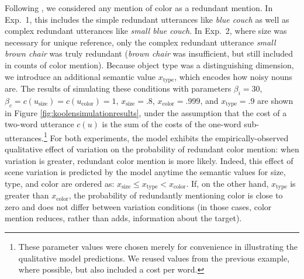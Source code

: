 \documentclass[11pt]{article}
\newcommand{\figref}[1]{Figure \ref{#1}}
\begin{document}
Following , we considered any mention of color as a redundant mention. In Exp.~1, this includes the simple redundant utterances like \emph{blue couch} as well as complex redundant utterances like \emph{small blue couch}. In Exp.~2, where size was necessary for unique reference, only the complex redundant utterance \emph{small brown chair} was truly redundant (\emph{brown chair} was insufficient, but still included in counts of color mention). 
Because object type was a distinguishing dimension, we introduce an additional semantic value $x_{\text{type}}$, which encodes how noisy nouns are.
The results of simulating these conditions with parameters $\beta_i = 30$, $ \beta_c = c(u_{\textrm{size}}) = c(u_{\textrm{color}}) = 1$, $x_{\text{size}} = .8$, $x_{\text{color}} = .999$, and $x_{\text{type}} = .9$ are shown in \figref{fig:koolensimulationresults}, under the assumption that the cost of a two-word utterance $c(u)$ is the sum of the costs of the one-word sub-utterances.\footnote{These parameter values were chosen merely for convenience in illustrating the qualitative model predictions. We reused values from the previous example, where possible, but also included a cost per word.}
For both experiments, the model exhibits the empirically-observed qualitative effect of variation on the probability of redundant color mention: when variation is greater, redundant color mention is more likely. 
Indeed, this effect of scene variation is predicted by the model anytime the semantic values for size, type, and color are ordered as: $x_{\text{size}} \leq  x_{\text{type}} < x_{\text{color}}$. If, on the other hand, $x_{\text{type}}$ is greater than $x_{\text{color}}$, the probability of redundantly mentioning color is close to zero and does not differ between variation conditions (in those cases, color mention reduces, rather than adds, information about the target). 
\end{document}
